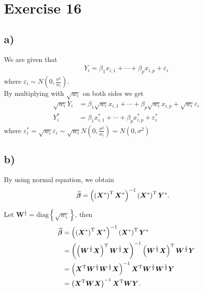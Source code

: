 \documentclass[a4paper]{article}
\begin{document}
\vspace{\baselineskip}
\section{Exercise 16}
\subsection{a)}
We are given that
\begin{align*}
Y_{i} = \beta_{1}x_{i,1} + \cdots + \beta_{p}x_{i,p} + \varepsilon_{i}
\end{align*}
where $\varepsilon_{i} \sim N\left(0,\frac{\sigma^{2}}{w_{i}}\right)$.\\
By multiplying with $\sqrt{w_{i}}$ on both sides we get
\begin{align*}
\sqrt{w_{i}}Y_{i} &= \beta_{1}\sqrt{w_{i}}x_{i,1} + \cdots + \beta_{p}\sqrt{w_{i}}x_{i,p} + \sqrt{w_{i}}\varepsilon_{i}\\
Y_{i}^{*} &= \beta_{1}x_{i,1}^{*} + \cdots + \beta_{p}x_{i,p}^{*} + \varepsilon_{i}^{*}
\end{align*}
where $\varepsilon_{i}^{*} = \sqrt{w_{i}}\varepsilon_{i} \sim \sqrt{w_{i}}N\left(0,\frac{\sigma^{2}}{w_{i}}\right) = N\left(0,\sigma^{2}\right)$


\vspace{\baselineskip}
\subsection{b)}
By using normal equation, we obtain
\begin{align*}
\widehat{\bm{\beta}} &= \left(\left(\bm{X}^{*}\right)^{\rm T}\bm{X}^{*}\right)^{-1}\left(\bm{X}^{*}\right)^{\rm T}\bm{Y}^{*}.
\end{align*}

Let $\bm{W}^{\frac{1}{2}} = \mathrm{diag}\left\{\sqrt{w_{i}}\right\}$, then
\begin{align*}
\widehat{\bm{\beta}} &= \left(\left(\bm{X}^{*}\right)^{\rm T}\bm{X}^{*}\right)^{-1}\left(\bm{X}^{*}\right)^{\rm T}\bm{Y}^{*}\\
&= \left(\left(\bm{W}^{\frac{1}{2}}\bm{X}\right)^{\rm T}\bm{W}^{\frac{1}{2}}\bm{X}\right)^{-1}\left(\bm{W}^{\frac{1}{2}}\bm{X}\right)^{\rm T}\bm{W}^{\frac{1}{2}}\bm{Y}\\
&= \left(\bm{X}^{\rm T}\bm{W}^{\frac{1}{2}}\bm{W}^{\frac{1}{2}}\bm{X}\right)^{-1}\bm{X}^{\rm T}\bm{W}^{\frac{1}{2}}\bm{W}^{\frac{1}{2}}\bm{Y}\\
&= \left(\bm{X}^{\rm T}\bm{W}\bm{X}\right)^{-1}\bm{X}^{\rm T}\bm{W}\bm{Y}.
\end{align*}
\end{document}

